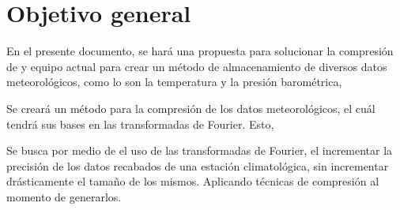 \section{Objetivo general}

En el presente documento, se hará una propuesta para solucionar la compresión de  y equipo actual para crear un método de almacenamiento de diversos datos meteorológicos, como lo son la temperatura y la presión barométrica,

Se creará un método para la compresión de los datos meteorológicos, el cuál tendrá sus bases en las transformadas de Fourier. Esto,

Se busca por medio de el uso de las transformadas de Fourier, el incrementar la precisión de los datos recabados de una estación climatológica, sin incrementar drásticamente el tamaño de los mismos. Aplicando técnicas de compresión al momento de generarlos.
